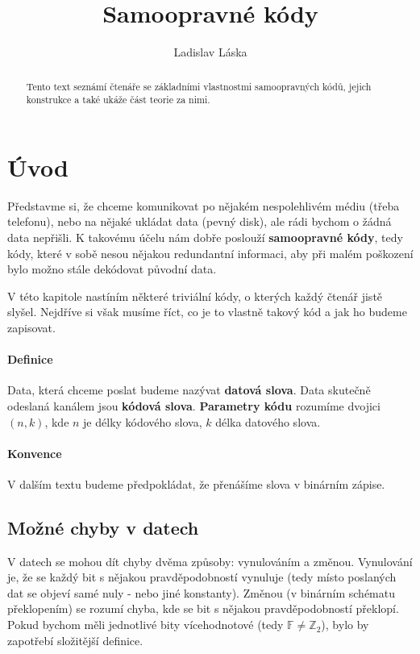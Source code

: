 \documentclass[a4paper,12pt]{article}
\title{Samoopravné kódy}
\author{Ladislav Láska}
\newcommand{\F}{\mathbb{F}}
\newcommand{\Z}{\mathbb{Z}}
\begin{document}
\maketitle
\thispagestyle{empty}
\begin{abstract}
Tento text seznámí čtenáře se základními vlastnostmi samoopravných kódů, jejich 
konstrukce a také ukáže část teorie za nimi.
\end{abstract}
\vskip2cm
\tableofcontents
\newpage

\parskip6pt

\section{Úvod}
Představme si, že chceme komunikovat po nějakém nespolehlivém médiu (třeba 
telefonu), nebo na nějaké ukládat data (pevný disk), ale rádi bychom o žádná 
data nepřišli. K takovému účelu nám dobře poslouží \textbf{samoopravné kódy}, 
tedy kódy, které v sobě nesou nějakou redundantní informaci, aby při malém 
poškození bylo možno stále dekódovat původní data.

V této kapitole nastíním některé triviální kódy, o kterých každý čtenář jistě 
slyšel. Nejdříve si však musíme říct, co je to vlastně takový kód a jak ho 
budeme zapisovat. 

\paragraph{Definice}
Data, která chceme poslat budeme nazývat \textbf{datová slova}. Data skutečně 
odeslaná kanálem jsou \textbf{kódová slova}.  \textbf{Parametry kódu} rozumíme 
dvojici $(n,k)$, kde $n$ je délky kódového slova, $k$ délka datového slova.
\paragraph{Konvence}
V dalším textu budeme předpokládat, že přenášíme slova v binárním zápise.

\subsection{Možné chyby v datech}
V datech se mohou dít chyby dvěma způsoby: vynulováním a změnou.  Vynulování je, 
že se každý bit s nějakou pravděpodobností vynuluje (tedy místo poslaných dat se 
objeví samé nuly - nebo jiné konstanty). Změnou (v binárním schématu 
překlopením) se rozumí chyba, kde se bit s nějakou pravděpodobností překlopí.  
Pokud bychom měli jednotlivé bity vícehodnotové (tedy $\F\neq\Z_2$), bylo by 
zapotřebí složitější definice.
\end{document}
